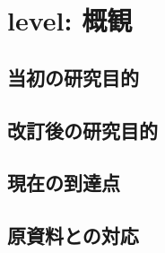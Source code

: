 
\section{level: 概観}

\subsection{当初の研究目的}

\subsection{改訂後の研究目的}

\subsection{現在の到達点}

\subsection{原資料との対応}
